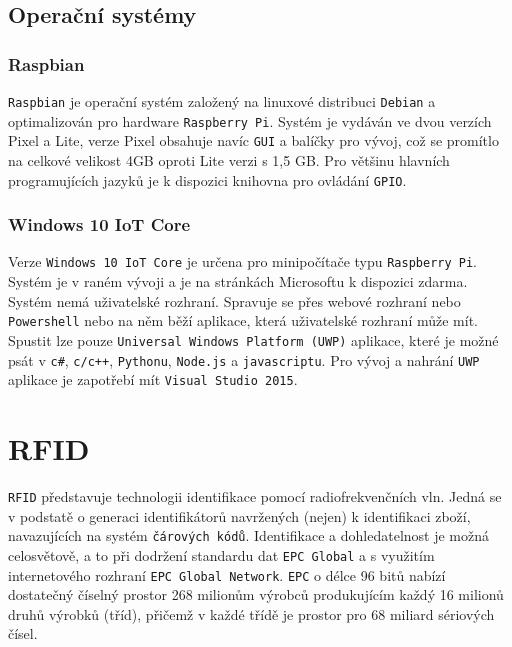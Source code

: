 \documentclass[czech,BP]{thesiskiv}
\begin{document}
		
		\subsection{Operační systémy}
			\subsubsection{Raspbian}
				\texttt{Raspbian} je operační systém založený na linuxové distribuci \texttt{Debian} a optimalizován pro hardware \texttt{Raspberry Pi}. Systém je vydáván ve dvou verzích Pixel a Lite, verze Pixel obsahuje navíc \texttt{GUI} a balíčky pro vývoj, což se promítlo na celkové velikost 4GB oproti Lite verzi s 1,5 GB. Pro většinu hlavních programujících jazyků je k dispozici knihovna pro ovládání \texttt{GPIO}.
			
			\subsubsection{Windows 10 IoT Core}
			Verze \texttt{Windows 10 IoT Core} je určena pro minipočítače typu \texttt{Raspberry Pi}. Systém je v raném vývoji a je na stránkách Microsoftu k dispozici zdarma.\\ Systém nemá uživatelské rozhraní. Spravuje se přes webové rozhraní nebo \texttt{Powershell} nebo na něm běží aplikace, která uživatelské rozhraní může mít. Spustit lze pouze \texttt{Universal Windows Platform (UWP)} aplikace, které je možné psát v \texttt{c\#}, \texttt{c/c++}, \texttt{Pythonu}, \texttt{Node.js} a \texttt{javascriptu}. Pro vývoj a nahrání \texttt{UWP} aplikace je zapotřebí mít \texttt{Visual Studio 2015}.

\newpage			
	\section{RFID}
\texttt{RFID} představuje technologii identifikace pomocí radiofrekvenčních vln. Jedná se v podstatě o generaci identifikátorů navržených (nejen) k identifikaci zboží, navazujících na systém \texttt{čárových kódů}. Identifikace a dohledatelnost je možná celosvětově, a to při dodržení standardu dat \texttt{EPC Global} a s využitím internetového rozhraní \texttt{EPC Global Network}. \texttt{EPC} o délce 96 bitů nabízí dostatečný číselný prostor 268 milionům výrobců produkujícím každý 16 milionů druhů výrobků (tříd), přičemž v každé třídě je prostor pro 68 miliard sériových čísel.\cite{dolevcek2010identifikace}
\end{document}
